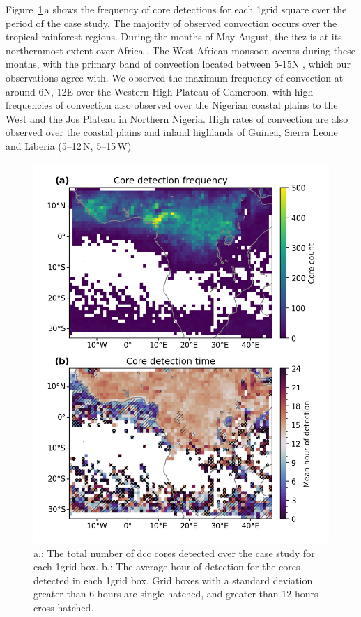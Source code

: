 \documentclass[acp, manuscript]{copernicus}
\begin{document}
Figure~\ref{fig:seviri_map_dists}\,a shows the frequency of core detections for each 1\textdegree grid square over the period of the case study. 
The majority of observed convection occurs over the tropical rainforest regions. 
During the months of May-August, the \acrfull{itcz} is at its northernmost extent over Africa \citep{nicholson_itcz_2018}. 
The West African monsoon occurs during these months, with the primary band of convection located between 5-15\textdegree N \citep{nicholson_revised_2009}, which our observations agree with. 
We observed the maximum frequency of convection at around 6\textdegree N, 12\textdegree E over the Western High Plateau of Cameroon, with high frequencies of convection also observed over the Nigerian coastal plains to the West and the Jos Plateau in Northern Nigeria. 
High rates of convection are also observed over the coastal plains and inland highlands of Guinea, Sierra Leone and Liberia (5--12\,\textdegree N, 5--15\,\textdegree W)


\begin{figure}[tp]
    \includegraphics[width=12cm]{figures/fig05.png}
    \caption[
    Number of detected cores and average hour of core detection
    ]{
    a.: The total number of \acrshort{dcc} cores detected over the case study for each 1\textdegree grid box. b.: The average hour of detection for the cores detected in each 1\textdegree grid box. Grid boxes with a standard deviation greater than 6 hours are single-hatched, and greater than 12 hours cross-hatched.
    }
    \label{fig:seviri_map_dists}
\end{figure}
\end{document}
